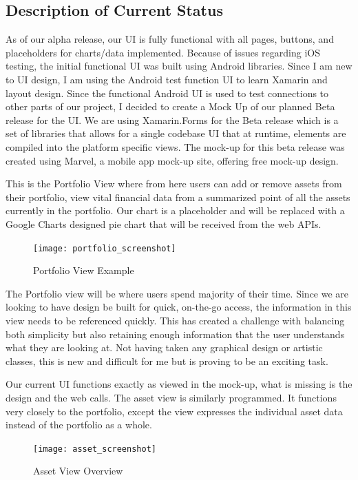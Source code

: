\documentclass[letterpaper,10pt,titlepage,journal,compsoc,draftclsnofoot,onecolumn]{IEEEtran}
\begin{document}
\subsection{Description of Current Status}
As of our alpha release, our UI is fully functional with all pages, buttons, and placeholders for charts/data implemented. Because of issues regarding iOS testing, the initial functional UI was built using Android libraries. Since I am new to UI design, I am using the Android test function UI to learn Xamarin and layout design. Since the functional Android UI is used to test connections to other parts of our project, I decided to create a Mock Up of our planned Beta release for the UI. We are using Xamarin.Forms for the Beta release which is a set of libraries that allows for a single codebase UI that at runtime, elements are compiled into the platform specific views. The mock-up for this beta release was created using Marvel, a mobile app mock-up site, offering free mock-up design.

This is the Portfolio View where from here users can add or remove assets from their portfolio, view vital financial data from a summarized point of all the assets currently in the portfolio. Our chart is a placeholder and will be replaced with a Google Charts designed pie chart that will be received from the web APIs.  

\begin{figure}[h]
   \caption{Portfolio View Example}
   \centering
   \texttt{[image: portfolio\_screenshot]}
\end{figure}

The Portfolio view will be where users spend majority of their time. Since we are looking to have design be built for quick, on-the-go access, the information in this view needs to be referenced quickly. This has created a challenge with balancing both simplicity but also retaining enough information that the user understands what they are looking at. Not having taken any graphical design or artistic classes, this is new and difficult for me but is proving to be an exciting task.

Our current UI functions exactly as viewed in the mock-up, what is missing is the design and the web calls. The asset view is similarly programmed. It functions very closely to the portfolio, except the view expresses the individual asset data instead of the portfolio as a whole.

\begin{figure}[h]
   \caption{Asset View Overview}
   \centering
   \texttt{[image: asset\_screenshot]}
\end{figure}
\end{document}
